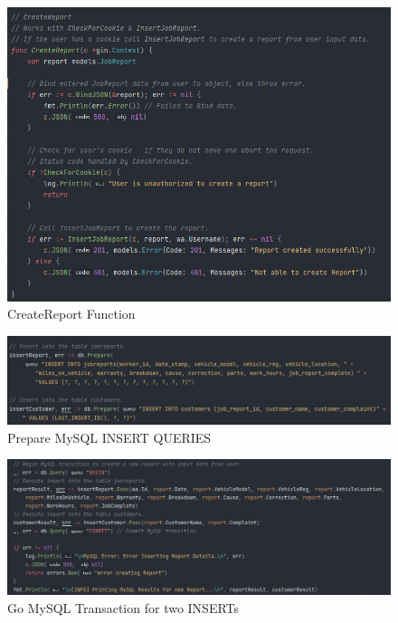 \begin{figure}[H]
    \caption{CreateReport Function}
    \label{image:createReport}
    \centering
    \includegraphics[width=1.0\textwidth]{images/horton/report_system/create_report.png}
\end{figure}

\begin{figure}[H]
    \caption{Prepare MySQL INSERT QUERIES}
    \label{image:insertReport}
    \centering
    \includegraphics[width=1.0\textwidth]{images/horton/report_system/insert_report.png}
\end{figure}


\begin{figure}[H]
    \caption{Go MySQL Transaction for two INSERTs}
    \label{image:go_mysql_trans}
    \centering
    \includegraphics[width=1.0\textwidth]{images/horton/report_system/go_mysql_transaction.png}
\end{figure}

